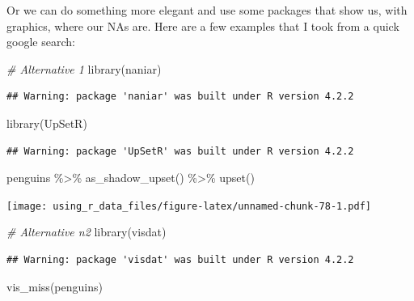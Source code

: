 \documentclass[
]{book}
\newenvironment{Shaded}{\begin{snugshade}}{\end{snugshade}}
\newcommand{\CommentTok}[1]{\textcolor[rgb]{0.56,0.35,0.01}{\textit{#1}}}
\newcommand{\FunctionTok}[1]{\textcolor[rgb]{0.00,0.00,0.00}{#1}}
\newcommand{\NormalTok}[1]{#1}
\newcommand{\SpecialCharTok}[1]{\textcolor[rgb]{0.00,0.00,0.00}{#1}}
\begin{document}
Or we can do something more elegant and use some packages that show us, with graphics, where our NAs are.
Here are a few examples that I took from a quick google search:

\begin{Shaded}
\begin{Highlighting}[]
\CommentTok{\# Alternative 1}
\FunctionTok{library}\NormalTok{(naniar)}
\end{Highlighting}
\end{Shaded}

\begin{verbatim}
## Warning: package 'naniar' was built under R version 4.2.2
\end{verbatim}

\begin{Shaded}
\begin{Highlighting}[]
\FunctionTok{library}\NormalTok{(UpSetR)}
\end{Highlighting}
\end{Shaded}

\begin{verbatim}
## Warning: package 'UpSetR' was built under R version 4.2.2
\end{verbatim}

\begin{Shaded}
\begin{Highlighting}[]
\NormalTok{penguins }\SpecialCharTok{\%\textgreater{}\%} 
  \FunctionTok{as\_shadow\_upset}\NormalTok{() }\SpecialCharTok{\%\textgreater{}\%} 
  \FunctionTok{upset}\NormalTok{()}
\end{Highlighting}
\end{Shaded}

\texttt{[image: using\_r\_data\_files/figure-latex/unnamed-chunk-78-1.pdf]}

\begin{Shaded}
\begin{Highlighting}[]
\CommentTok{\# Alternative n2}
\FunctionTok{library}\NormalTok{(visdat)}
\end{Highlighting}
\end{Shaded}

\begin{verbatim}
## Warning: package 'visdat' was built under R version 4.2.2
\end{verbatim}

\begin{Shaded}
\begin{Highlighting}[]
\FunctionTok{vis\_miss}\NormalTok{(penguins)}
\end{Highlighting}
\end{Shaded}
\end{document}
